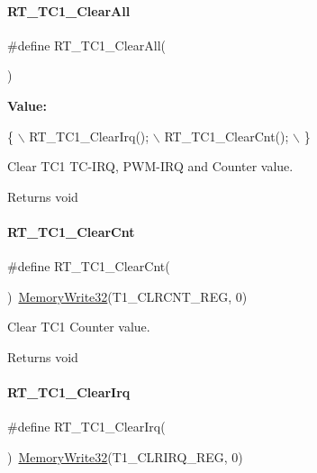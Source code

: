 \paragraph{\texorpdfstring{R\+T\+\_\+\+T\+C1\+\_\+\+Clear\+All}{RT\_TC1\_ClearAll}}
{\footnotesize\ttfamily \#define R\+T\+\_\+\+T\+C1\+\_\+\+Clear\+All(\begin{DoxyParamCaption}{ }\end{DoxyParamCaption})}

{\bfseries Value\+:}
\begin{DoxyCode}
\{                   \(\backslash\)
        RT\_TC1\_ClearIrq(); \(\backslash\)
        RT\_TC1\_ClearCnt(); \(\backslash\)
    \}
\end{DoxyCode}


Clear T\+C1 T\+C-\/\+I\+RQ, P\+W\+M-\/\+I\+RQ and Counter value. 

\begin{DoxyReturn}{Returns}
void 
\end{DoxyReturn}
\mbox{\label{a00044_abcd4f7c1a53b5d0a31f45076725a1ed6}} 
\paragraph{\texorpdfstring{R\+T\+\_\+\+T\+C1\+\_\+\+Clear\+Cnt}{RT\_TC1\_ClearCnt}}
{\footnotesize\ttfamily \#define R\+T\+\_\+\+T\+C1\+\_\+\+Clear\+Cnt(\begin{DoxyParamCaption}{ }\end{DoxyParamCaption})~\mbox{\hyperlink{a00020_ad9953f631a539cfaa35baf94f878b3ec}{Memory\+Write32}}(T1\+\_\+\+C\+L\+R\+C\+N\+T\+\_\+\+R\+EG, 0)}



Clear T\+C1 Counter value. 

\begin{DoxyReturn}{Returns}
void 
\end{DoxyReturn}
\mbox{\label{a00044_ab9c21242bf3ba2144aa45a336a4dc7ea}} 
\paragraph{\texorpdfstring{R\+T\+\_\+\+T\+C1\+\_\+\+Clear\+Irq}{RT\_TC1\_ClearIrq}}
{\footnotesize\ttfamily \#define R\+T\+\_\+\+T\+C1\+\_\+\+Clear\+Irq(\begin{DoxyParamCaption}{ }\end{DoxyParamCaption})~\mbox{\hyperlink{a00020_ad9953f631a539cfaa35baf94f878b3ec}{Memory\+Write32}}(T1\+\_\+\+C\+L\+R\+I\+R\+Q\+\_\+\+R\+EG, 0)}




